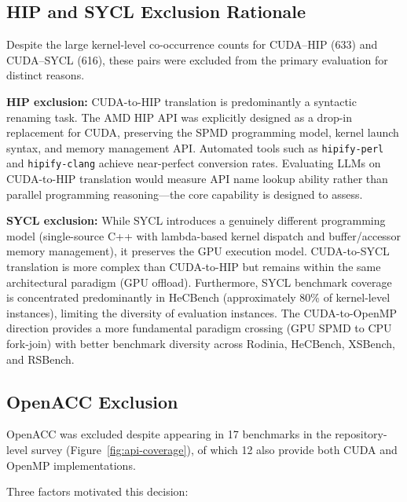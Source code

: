 \subsection{HIP and SYCL Exclusion Rationale}
\label{sec:appendix-b3}

Despite the large kernel-level co-occurrence counts for CUDA--HIP (633) and CUDA--SYCL (616), these pairs were excluded from the primary evaluation for distinct reasons.

\textbf{HIP exclusion:} CUDA-to-HIP translation is predominantly a syntactic renaming task. The AMD HIP API was explicitly designed as a drop-in replacement for CUDA, preserving the SPMD programming model, kernel launch syntax, and memory management API. Automated tools such as \texttt{hipify-perl} and \texttt{hipify-clang} achieve near-perfect conversion rates. Evaluating LLMs on CUDA-to-HIP translation would measure API name lookup ability rather than parallel programming reasoning---the core capability \parbench{} is designed to
assess.

\textbf{SYCL exclusion:} While SYCL introduces a genuinely different programming model (single-source C++ with lambda-based kernel dispatch and buffer/accessor memory management), it preserves the GPU execution model. CUDA-to-SYCL translation is more complex than CUDA-to-HIP but remains within the same architectural paradigm (GPU offload). Furthermore, SYCL benchmark coverage is concentrated predominantly in HeCBench (approximately 80\% of kernel-level instances), limiting the diversity of evaluation instances. The CUDA-to-OpenMP direction provides a more fundamental paradigm crossing (GPU SPMD to CPU fork-join) with better benchmark diversity across Rodinia, HeCBench, XSBench, and RSBench.

\subsection{OpenACC Exclusion}
\label{sec:appendix-b4}

OpenACC was excluded despite appearing in 17 benchmarks in the repository-level survey (Figure~\ref{fig:api-coverage}), of which 12 also provide both CUDA and OpenMP implementations. 

Three factors motivated this decision:

